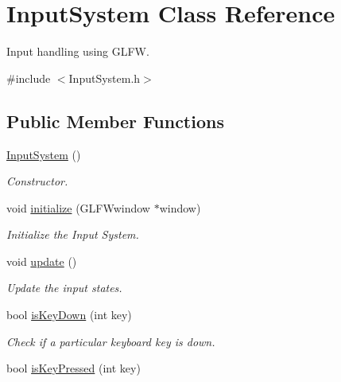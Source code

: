 \hypertarget{class_input_system}{}\section{Input\+System Class Reference}
\label{class_input_system}


Input handling using G\+L\+FW.  




{\ttfamily \#include $<$Input\+System.\+h$>$}

\subsection*{Public Member Functions}
\begin{DoxyCompactItemize}
\item 
\mbox{\label{class_input_system_a2f18d9fdb44805c63984113c1433c223}} 
\mbox{\hyperlink{class_input_system_a2f18d9fdb44805c63984113c1433c223}{Input\+System}} ()
\begin{DoxyCompactList}\small\item\em Constructor. \end{DoxyCompactList}\item 
void \mbox{\hyperlink{class_input_system_aefb9cb14b783824b3b881ead2812b695}{initialize}} (G\+L\+F\+Wwindow $\ast$window)
\begin{DoxyCompactList}\small\item\em Initialize the Input System. \end{DoxyCompactList}\item 
\mbox{\label{class_input_system_aeb2d30a71d7dc462258febd00ea77ea3}} 
void \mbox{\hyperlink{class_input_system_aeb2d30a71d7dc462258febd00ea77ea3}{update}} ()
\begin{DoxyCompactList}\small\item\em Update the input states. \end{DoxyCompactList}\item 
bool \mbox{\hyperlink{class_input_system_aa7758990eeeebe5a42fc79116ee60983}{is\+Key\+Down}} (int key)
\begin{DoxyCompactList}\small\item\em Check if a particular keyboard key is down. \end{DoxyCompactList}\item 
bool \mbox{\hyperlink{class_input_system_a1518b44c6d45b3fb9a03e9fdad59eb67}{is\+Key\+Pressed}} (int key)

\end{DoxyCompactItemize}
